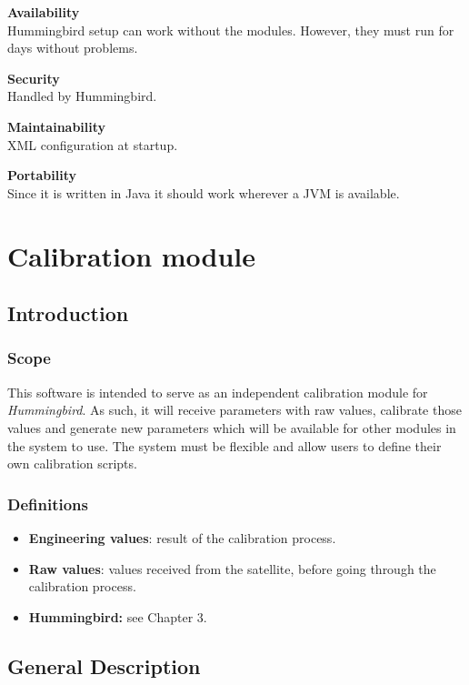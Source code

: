 \textbf{Availability}\\
Hummingbird setup can work without the modules. However, they must run for days without problems.

\textbf{Security}\\
Handled by Hummingbird.

\textbf{Maintainability}\\
XML configuration at startup.

\textbf{Portability}\\
Since it is written in Java it should work wherever a JVM is available.

\section{Calibration module}

\subsection{Introduction}

\subsubsection{Scope}

This software is intended to serve as an independent calibration module for \emph{Hummingbird}. As such, it will receive parameters with raw values, calibrate those values and generate new parameters which will be available for other modules in the system to use. The system must be flexible and allow users to define their own calibration scripts.

\subsubsection{Definitions}

\begin{itemize}
\item \textbf{Engineering values}: result of the calibration process.
\item \textbf{Raw values}: values received from the satellite, before going through the calibration process.
\item \textbf{Hummingbird:} see Chapter 3.
\end{itemize}

\subsection{General Description}
